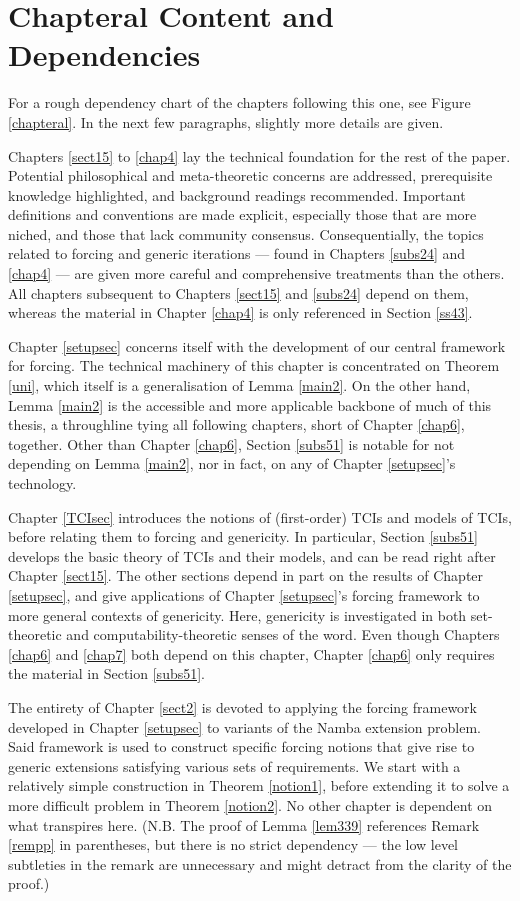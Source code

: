 \documentclass[12pt, twoside]{memoir}
\numberwithin{equation}{section}
\theoremstyle{definition}
\theoremstyle{remark}
\theoremstyle{definition}
\theoremstyle{definition}
\theoremstyle{definition}
\theoremstyle{remark}
\begin{document}
\section{Chapteral Content and Dependencies}

For a rough dependency chart of the chapters following this one, see Figure \ref{chapteral}. In the next few paragraphs, slightly more details are given.

Chapters \ref{sect15} to \ref{chap4} lay the technical foundation for the rest of the paper. Potential philosophical and meta-theoretic concerns are addressed, prerequisite knowledge highlighted, and background readings recommended. Important definitions and conventions are made explicit, especially those that are more niched, and those that lack community consensus. Consequentially, the topics related to forcing and generic iterations --- found in Chapters \ref{subs24} and \ref{chap4} --- are given more careful and comprehensive treatments than the others. All chapters subsequent to Chapters \ref{sect15} and \ref{subs24} depend on them, whereas the material in Chapter \ref{chap4} is only referenced in Section \ref{ss43}.

Chapter \ref{setupsec} concerns itself with the development of our central framework for forcing. The technical machinery of this chapter is concentrated on Theorem \ref{uni}, which itself is a generalisation of Lemma \ref{main2}. On the other hand, Lemma \ref{main2} is the accessible and more applicable backbone of much of this thesis, a throughline tying all following chapters, short of Chapter \ref{chap6}, together. Other than Chapter \ref{chap6}, Section \ref{subs51} is notable for not depending on Lemma \ref{main2}, nor in fact, on any of Chapter \ref{setupsec}'s technology.

Chapter \ref{TCIsec} introduces the notions of (first-order) TCIs and models of TCIs, before relating them to forcing and genericity. In particular, Section \ref{subs51} develops the basic theory of TCIs and their models, and can be read right after Chapter \ref{sect15}. The other sections depend in part on the results of Chapter \ref{setupsec}, and give applications of Chapter \ref{setupsec}'s forcing framework to more general contexts of genericity. Here, genericity is investigated in both set-theoretic and computability-theoretic senses of the word. Even though Chapters \ref{chap6} and \ref{chap7} both depend on this chapter, Chapter \ref{chap6} only requires the material in Section \ref{subs51}.

The entirety of Chapter \ref{sect2} is devoted to applying the forcing framework developed in Chapter \ref{setupsec} to variants of the Namba extension problem. Said framework is used to construct specific forcing notions that give rise to generic extensions satisfying various sets of requirements. We start with a relatively simple construction in Theorem \ref{notion1}, before extending it to solve a more difficult problem in Theorem \ref{notion2}. No other chapter is dependent on what transpires here. (N.B. The proof of Lemma \ref{lem339} references Remark \ref{rempp} in parentheses, but there is no strict dependency --- the low level subtleties in the remark are unnecessary and might detract from the clarity of the proof.)
\end{document}
